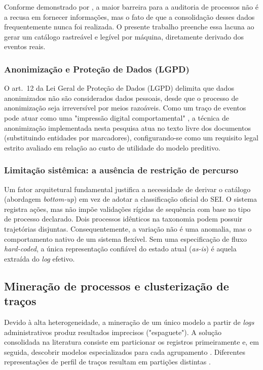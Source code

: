 Conforme demonstrado por , a maior barreira para a auditoria de processos não é a recusa em fornecer informações, mas o fato de que a consolidação desses dados frequentemente nunca foi realizada. O presente trabalho preenche essa lacuna ao gerar um catálogo rastreável e legível por máquina, diretamente derivado dos eventos reais.

\subsubsection{Anonimização e Proteção de Dados (LGPD)}

O art.~12 da Lei Geral de Proteção de Dados (LGPD) \cite{brasil2018lgpd} delimita que dados anonimizados não são considerados dados pessoais, desde que o processo de anonimização seja irreversível por meios razoáveis. Como um traço de eventos pode atuar como uma "impressão digital comportamental" \cite{mannhardt2019privacy}, a técnica de anonimização implementada nesta pesquisa atua no texto livre dos documentos (substituindo entidades por marcadores), configurando-se como um requisito legal estrito avaliado em relação ao custo de utilidade do modelo preditivo.

\subsubsection{Limitação sistêmica: a ausência de restrição de percurso}
\label{sec:rev-naorestringe}

Um fator arquitetural fundamental justifica a necessidade de derivar o catálogo (abordagem \emph{bottom-up}) em vez de adotar a classificação oficial do SEI. O sistema registra ações, mas não impõe validações rígidas de sequência com base no tipo de processo declarado. Dois processos idênticos na taxonomia podem possuir trajetórias disjuntas. Consequentemente, a variação não é uma anomalia, mas o comportamento nativo de um sistema flexível. Sem uma especificação de fluxo \emph{hard-coded}, a única representação confiável do estado atual (\emph{as-is}) é aquela extraída do \emph{log} efetivo.

\subsection{Mineração de processos e clusterização de traços}
\label{sec:rev-clustering}

Devido à alta heterogeneidade, a mineração de um único modelo a partir de \emph{logs} administrativos produz resultados imprecisos ("espaguete"). A solução consolidada na literatura consiste em particionar os registros primeiramente e, em seguida, descobrir modelos especializados para cada agrupamento \cite{greco2006clustering}. Diferentes representações de perfil de traços resultam em partições distintas \cite{song2009trace, bose2009context, dekoninck2018act2vec}. 


